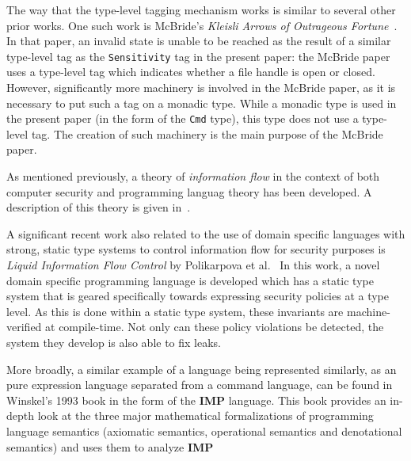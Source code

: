 \documentclass[10pt, conference]{IEEEtran}
\newcommand{\ttt}{\texttt}
\begin{document}
The way that the type-level tagging mechanism works is similar to several other
prior works. One such work is McBride's \textit{Kleisli Arrows of Outrageous
Fortune}~\cite{KleisliArrows}. In that paper, an invalid state is unable to be
reached as the result of a similar type-level tag as the \ttt{Sensitivity} tag
in the present paper: the McBride paper uses a type-level tag which indicates
whether a file handle is open or closed. However, significantly more machinery
is involved in the McBride paper, as it is necessary to put such a tag on a
monadic type. While a monadic type is used in the present paper (in the form of
the \ttt{Cmd} type), this type does not use a type-level tag. The creation of
such machinery is the main purpose of the McBride paper.

As mentioned previously, a theory of \textit{information flow} in the context of
both computer security and programming languag theory has been developed. A description
of this theory is given in~\cite{InfoFlowAnalysis}.

A significant recent work also related to the use of domain specific languages
with strong, static type systems to control information flow for security
purposes is \textit{Liquid Information Flow Control} by Polikarpova et
al.~\cite{Lifty} In this work, a novel domain specific programming language is
developed which has a static type system that is geared specifically towards
expressing security policies at a type level. As this is done within a static
type system, these invariants are machine-verified at compile-time.  Not only
can these policy violations be detected, the system they develop is also able to
fix leaks.

More broadly, a similar example of a language being represented similarly, as an
pure expression language separated from a command language, can be found in
Winskel's 1993 book in the form of the \textbf{IMP} language.\cite{WinskelBook} This
book provides an in-depth look at the three major mathematical formalizations
of programming language semantics (axiomatic semantics, operational semantics and
denotational semantics) and uses them to analyze \textbf{IMP}
\end{document}
